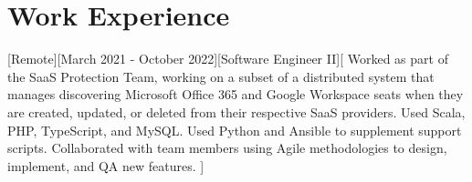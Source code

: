 \documentclass[showluaboxes=false]{resume}
\begin{document}
		\section{Work Experience} %
		[Remote][March 2021 - October 2022][Software Engineer II][%
		Worked as part of the SaaS Protection Team, working on a subset of a distributed system that manages discovering Microsoft Office 365 and Google Workspace seats when they are created, updated, or deleted from their respective SaaS providers. %
		Used Scala, PHP, TypeScript, and MySQL. Used Python and Ansible to supplement support scripts. %
		Collaborated with team members using Agile methodologies to design, implement, and QA new features.%
% 
		]%
\end{document}
